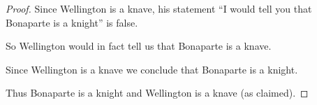 \documentclass[10pt,]{book}
\theoremstyle{plain}
\theoremstyle{definition}
\theoremstyle{definition}
\numberwithin{equation}{section}
\newcommand{\hint}[1]{ }
\begin{document}
\begin{enumerate}[label=(\alph*)]
\begin{enumerate}[label=\roman*.]
\begin{proof}
            Since Wellington is a knave, his statement ``I would tell you that Bonaparte is a knight'' is false.
\par

            So Wellington would in fact tell us that Bonaparte is a knave.
\par

            Since Wellington is a knave we conclude that Bonaparte is a knight.
\par

            Thus Bonaparte is a knight and Wellington is a knave (as claimed).
\end{proof}


        \hint{
        Here's the second one:

        \begin{proof}\hypertarget{proof-4}{}

            Either Wellington is a knave or Wellington is a knight.
\par

            \text{ It's either one thing or the other! }
\par

            If Wellington is a knight it follows that Bonaparte is a knight.
\par

            \text{ That's what he said he would tell us and if he's a knight we can trust him. }
\par

            If Bonaparte is a knight then Wellington is a knave.
\par

            \text{ True, because that is one of the things Bonaparte states. }
\par

            So, if Wellington is a knight then Wellington is a knave (which is impossible!)
\par

            \text{ This is just summing up what was deduced above. }
\par

            Thus, Wellington is a knave.
\par

            \text{ Because the other possibility leads to something \emph{im}possible. }
\par


\end{proof}}
\end{enumerate}
\end{enumerate}
\end{document}
